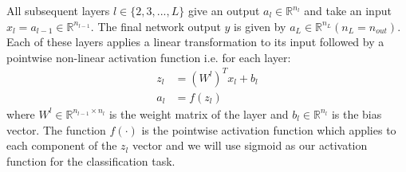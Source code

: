 All subsequent layers $l \in \{2,3,...,L\}$ give an output $a_l \in \mathbb{R}^{n_{l}}$ and take an input $x_l = a_{l-1} \in \mathbb{R}^{n_{l-1}}$. The final network output $y$ is given by $a_L \in \mathbb{R}^{n_L} (n_L = n_{out})$.
Each of these layers applies a linear transformation to its input followed by a pointwise non-linear activation function i.e. for each layer:
\begin{align}
z_l &= (W^l)^T x_l + b_l \\
a_l &= f(z_l)
\end{align}
where $W^l \in \mathbb{R}^{n_{l-1} \times n_l}$ is the weight matrix of the layer and $b_l \in \mathbb{R}^{n_l}$ is the bias vector. The function $f(\cdot)$ is the pointwise activation function which applies to each component of the $z_l$ vector and we will use sigmoid as our activation function for the classification task.
